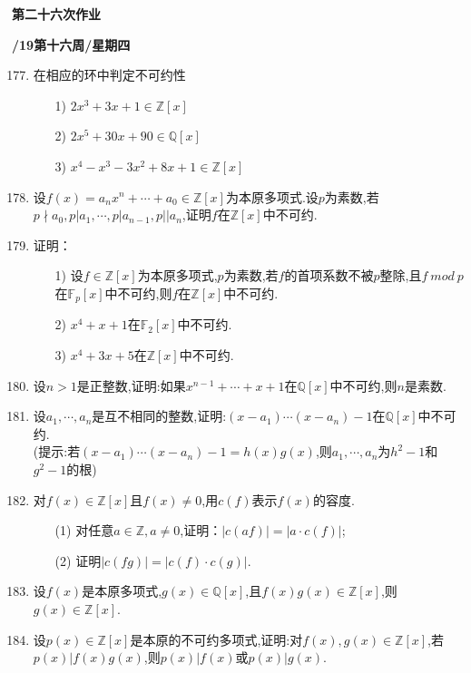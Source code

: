 \documentclass[a4paper,12pt]{article}
\begin{document}
 \newpage
\head
 \begin{center}
 {\Large \bf 第二十六次作业}
 \vspace{2mm}
 
 {\bf{}/19\quad 第十六周/星期四}
 \end{center}
 
 \begin{enumerate}\setcounter{enumi}{176}
 \item 在相应的环中判定不可约性
 \begin{itemize}
 \item [1)]$2x^3+3x+1\in\mathbb{Z}[x]$
 \item [2)]$2x^5+30x+90\in\mathbb{Q}[x]$
 \item [3)]$x^4-x^3-3x^2+8x+1\in\mathbb{Z}[x]$
 \end{itemize}
 \item 设$f(x)=a_nx^n+\cdots+a_0\in\mathbb{Z}[x]$为本原多项式.设$p$为素数,若$p\nmid a_0,p|a_1,\cdots,p| a_{n-1},p||a_n$,证明$f$在$\mathbb{Z}[x]$中不可约.
 \item 证明：
 \begin{itemize}
 \item[1)]设$f\in\mathbb{Z}[x]$为本原多项式,$p$为素数,若$f$的首项系数不被$p$整除,且$f\ mod\ p$在$\mathbb{F}_p[x]$中不可约,则$f$在$\mathbb{Z}[x]$中不可约.
 \item[2)]$x^4+x+1$在$\mathbb{F}_2[x]$中不可约.
 \item[3)]$x^4+3x+5$在$\mathbb{Z}[x]$中不可约. 
 \end{itemize}
 \item 设$n>1$是正整数,证明:如果$x^{n-1}+\cdots+x+1$在$\mathbb{Q}[x]$中不可约,则$n$是素数.
 \item 设$a_1,\cdots,a_n$是互不相同的整数,证明:$(x-a_1)\cdots(x-a_n)-1$在$\mathbb{Q}[x]$中不可约.\\({\color{blue}提示:若$(x-a_1)\cdots(x-a_n)-1=h(x)g(x)$,则$a_1,\cdots,a_n$为$h^2-1$和$g^2-1$的根})
 
 \item 对$f(x)\in \mathbb{Z}[x]$且$f(x)\neq 0$,用$c(f)$表示$f(x)$的容度.
 \begin{itemize}
 \item[(1)] 对任意$a\in \mathbb{Z},a\neq 0$,证明：$|c(af)|=|a\cdot c(f)|$;
 \item[(2)] 证明$|c(fg)|=|c(f)\cdot c(g)|$.
 \end{itemize}
 \item 设$f(x)$是本原多项式,$g(x)\in\mathbb{Q}[x]$,且$f(x)g(x)\in\mathbb{Z}[x]$,则$g(x)\in\mathbb{Z}[x]$.
 \item 设$p(x)\in \mathbb{Z}[x]$是本原的不可约多项式,证明:对$f
 (x),g(x)\in\mathbb{Z}[x]$,若$p(x)|f(x)g(x)$,则$p(x)|f(x)$或$p(x)|g(x)$.
 
 \end{enumerate}
\end{document}
